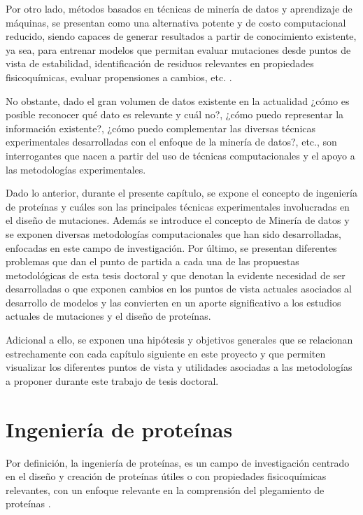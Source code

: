 Por otro lado, métodos basados en técnicas de minería de datos y aprendizaje de máquinas, se presentan como una alternativa potente y de costo computacional reducido, siendo capaces de generar resultados a partir de conocimiento existente, ya sea, para entrenar modelos que permitan evaluar mutaciones desde puntos de vista de estabilidad, identificación de residuos relevantes en propiedades fisicoquímicas, evaluar propensiones a cambios, etc. \cite{Capriotti2005, softwareVHL, article}. 

No obstante, dado el gran volumen de datos existente en la actualidad ¿cómo es posible reconocer qué dato es relevante y cuál no?, ¿cómo puedo representar la información existente?, ¿cómo puedo complementar las diversas técnicas experimentales desarrolladas con el enfoque de la minería de datos?, etc., son interrogantes que nacen a partir del uso de técnicas computacionales y el apoyo a las metodologías experimentales.

Dado lo anterior, durante el presente capítulo, se expone el concepto de ingeniería de proteínas y cuáles son las principales técnicas experimentales involucradas en el diseño de mutaciones. Además se introduce el concepto de Minería de datos y se exponen diversas metodologías computacionales que han sido desarrolladas, enfocadas en este campo de investigación. Por último, se presentan diferentes problemas que dan el punto de partida a cada una de las propuestas metodológicas de esta tesis doctoral y que denotan la evidente necesidad de ser desarrolladas o que exponen cambios en los puntos de vista actuales asociados al desarrollo de modelos y las convierten en un aporte significativo a los estudios actuales de mutaciones y el diseño de proteínas. 

Adicional a ello, se exponen una hipótesis y objetivos generales que se relacionan estrechamente con cada capítulo siguiente en este proyecto y que permiten visualizar los diferentes puntos de vista y utilidades asociadas a las metodologías a proponer durante este trabajo de tesis doctoral.

\section{Ingeniería de proteínas \label{cap1:sec1}}

Por definición, la ingeniería de proteínas, es un campo de investigación centrado en el diseño y creación de proteínas útiles o con propiedades fisicoquímicas relevantes, con un enfoque relevante en la comprensión del plegamiento de proteínas \cite{liszewski2015speeding}.

